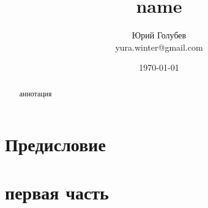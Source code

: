 \documentclass[a4paper,12pt]{article} %
\author{Юрий Голубев\\ yura.winter@gmail.com }
\title{name}
\date{\today}
\begin{document}
\maketitle

\begin{abstract}
аннотация
\end{abstract}
\tableofcontents
		
\section*{Предисловие}




\clearpage
\section{первая часть}








\printindex



\end{document}
